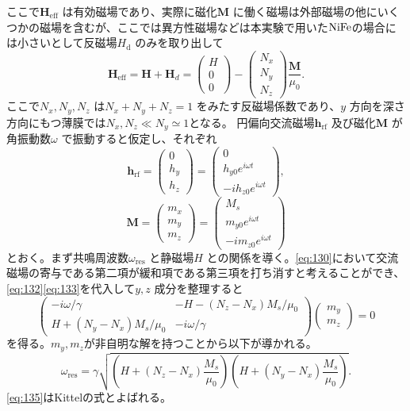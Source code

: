 \documentclass[dvipdfmx]{jsreport}
\numberwithin{equation}{chapter}
\numberwithin{table}{chapter}
\begin{document}
ここで$\bm{H}_\text{eff} $ は有効磁場であり、実際に磁化$\bm{M}$ に働く磁場は外部磁場の他にいくつかの磁場を含むが、ここでは異方性磁場などは本実験で用いた$\ce{NiFe}$の場合には小さいとして反磁場$H_\text{d} $ のみを取り出して
\begin{equation}
\label{eq:131}
	\bm{H}_\text{eff} =\bm{H}+\bm{H}_d=\begin{pmatrix} H\\0\\0 \end{pmatrix} -\begin{pmatrix} N_x\\N_y\\N_z \end{pmatrix} \frac{\bm{M}}{\mu_0}
.\end{equation}
ここで$N_x,N_y,N_z$ は$N_x+N_y+N_z=1$ をみたす反磁場係数であり、$y$ 方向を深さ方向にもつ薄膜では$N_x,N_z\ll N_y\simeq 1$となる。
円偏向交流磁場$\bm{h}_\text{rf} $ 及び磁化$\bm{M}$ が角振動数$\omega$ で振動すると仮定し、それぞれ
\begin{equation}
\label{eq:132}
	\bm{h}_\text{rf} =\begin{pmatrix} 0\\h_y\\h_z \end{pmatrix} = \begin{pmatrix} 0\\h_{y0}e^{i\omega t}\\-ih_{z 0}e^{i\omega t} \end{pmatrix} 
,\end{equation}
\begin{equation}
\label{eq:133}
	\bm{M} =\begin{pmatrix} m_x\\m_y\\m_z \end{pmatrix} = \begin{pmatrix} M_s\\m_{y0}e^{i\omega t}\\-im_{z 0}e^{i\omega t} \end{pmatrix} 
\end{equation}
とおく。まず共鳴周波数$\omega_\text{res} $ と静磁場$H$ との関係を導く。\eqref{eq:130}において交流磁場の寄与である第二項が緩和項である第三項を打ち消すと考えることができ、\eqref{eq:132}\eqref{eq:133}を代入して$y,z$ 成分を整理すると
\begin{equation}
\label{eq:134}
\begin{pmatrix}  -i \omega  /\gamma&-H-(N_z-N_x) M_s /\mu_0 \\ H+(N_y-N_x) M_s /\mu_0 & -i \omega /\gamma\end{pmatrix} \begin{pmatrix} m_y \\ m_z \end{pmatrix} =0
\end{equation}
を得る。$m_y,m_z$が非自明な解を持つことから以下が導かれる。
\begin{equation}
\label{eq:135}
	\omega_\text{res} =\gamma \sqrt{\left( H+(N_z-N_x) \frac{M_s}{\mu_0} \right)\left( H+(N_y-N_x) \frac{M_s}{\mu_0} \right)  } 
.\end{equation}
\eqref{eq:135}はKittelの式とよばれる。
\end{document}
